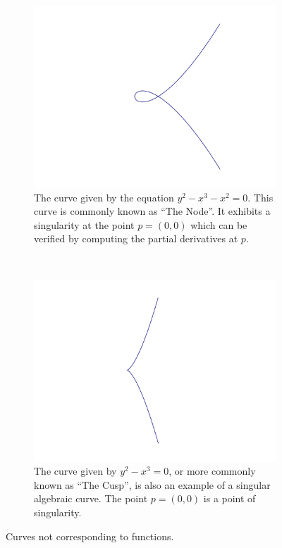 \documentclass{article}
\begin{document}
    \begin{figure}[h!]
        \centering
        \begin{subfigure}[t]{0.45\textwidth}
            \includegraphics[width=\textwidth]{pictures/node.pdf}
            \caption{The curve given by the equation $y^2 - x^3 - x^2 = 0$.
            This curve is commonly known as ``The Node''. It exhibits a
            singularity at the point $p = (0, 0)$ which can be verified by
            computing the partial derivatives at $p$.}
            \label{fig:node}
        \end{subfigure}        
        ~
        \begin{subfigure}[t]{0.45\textwidth}
            \includegraphics[width=\textwidth]{pictures/cusp.pdf}
            \caption{The curve given by $y^2 - x^3 = 0$, or more commonly known
            as ``The Cusp'', is also an example of a singular algebraic curve.
        The point $p = (0, 0)$ is a point of singularity.}
        \end{subfigure}
        \caption{Curves not corresponding to functions.}
        \label{fig:algebraic_curves}
    \end{figure}
    
\end{document}
